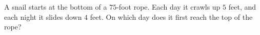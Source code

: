 A snail starts at the bottom of a $75$-foot rope. Each day it crawls up $5$ feet, and each night it slides down $4$ feet. On which day does it first reach the top of the rope?
